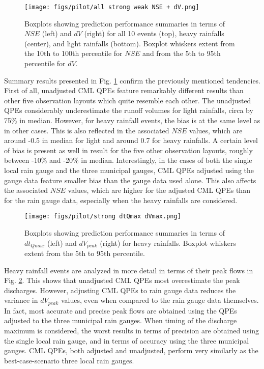 \documentclass{ctuthesis}\usepackage[]{graphicx}\usepackage[]{color}
\begin{document}
\begin{figure}[H]
\begin{center}
\texttt{[image: figs/pilot/all strong weak NSE + dV.png]}
\caption{Boxplots showing prediction performance summaries in terms of $N\!S\!E$ (left) and $dV$ (right) for all 10 events (top), heavy rainfalls (center), and light rainfalls (bottom). Boxplot whiskers extent from the 10th to 100th percentile for $N\!S\!E$ and from the 5th to 95th percentile for $dV$.} \label{pil_fig2}
\end{center}
\end{figure}

Summary results presented in Fig. \ref{pil_fig2} confirm the previously mentioned tendencies. First of all, unadjusted CML QPEs feature remarkably different results than other five observation layouts which quite resemble each other. The unadjusted QPEs considerably underestimate the runoff volumes for light rainfalls, circa by 75\% in median. However, for heavy rainfall events, the bias is at the same level as in other cases. This is also reflected in the associated $N\!S\!E$ values, which are around -0.5 in median for light and around 0.7 for heavy rainfalls. A certain level of bias is present as well in result for the five other observation layouts, roughly between -10\% and -20\% in median. Interestingly, in the cases of both the single local rain gauge and the three municipal gauges, CML QPEs adjusted using the gauge data feature smaller bias than the gauge data used alone. This also affects the associated $N\!S\!E$ values, which are higher for the adjusted CML QPEs than for the rain gauge data, especially when the heavy rainfalls are considered.

\begin{figure}[H]
\begin{center}
\texttt{[image: figs/pilot/strong dtQmax dVmax.png]}
\caption{Boxplots showing prediction performance summaries in terms of $dt_{Qmax}$ (left) and $dV_{peak}$ (right) for heavy rainfalls. Boxplot whiskers extent from the 5th to 95th percentile.} \label{pil_fig3}
\end{center}
\end{figure}

Heavy rainfall events are analyzed in more detail in terms of their peak flows in Fig. \ref{pil_fig3}. This shows that unadjusted CML QPEs most overestimate the peak discharges. However, adjusting CML QPEs to rain gauge data reduces the variance in $dV_{peak}$ values, even when compared to the rain gauge data themselves. In fact, most accurate and precise peak flows are obtained using the QPEs adjusted to the three municipal rain gauges. When timing of the discharge maximum is considered, the worst results in terms of precision are obtained using the single local rain gauge, and in terms of accuracy using the three municipal gauges. CML QPEs, both adjusted and unadjusted, perform very similarly as the best-case-scenario three local rain gauges.
\end{document}
